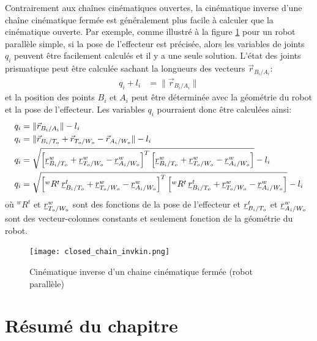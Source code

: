 Contrairement aux chaînes cinématiques ouvertes, la cinématique inverse d'une chaîne cinématique fermée est généralement plus facile à calculer que la cinématique ouverte. Par exemple, comme illustré à la figure \ref{fig:closed_chain_invkin} pour un robot parallèle simple, si la pose de l'effecteur est précisée, alors les variables de joints $q_i$ peuvent être facilement calculés et il y a une seule solution. L'état des joints prismatique peut être calculée sachant la longueurs des vecteurs $\vec{r}_{B_i/A_i}$:
\begin{align}
q_i + l_i &= \| \vec{r}_{B_i/A_i} \|
\end{align} 
et la position des points $B_i$ et $A_i$ peut être déterminée avec la géométrie du robot et la pose de l'effecteur. Les variables $q_i$ pourraient donc être calculées ainsi:
\begin{align}
q_i &= \| \vec{r}_{B_i/A_i} \| - l_i \\
q_i &= \| \vec{r}_{B_i/T_o} +  \vec{r}_{T_o/W_o} - \vec{r}_{A_i/W_o} \| - l_i \\
q_i &= \sqrt{\left[  \underline{r}_{B_i/T_o}^w + \underline{r}_{T_o/W_o}^w - \underline{r}_{A_i/W_o}^w
\right]^T \left[  \underline{r}_{B_i/T_o}^w + \underline{r}_{T_o/W_o}^w - \underline{r}_{A_i/W_o}^w
\right]} - l_i \\
q_i &= \sqrt{\left[  {}^wR^t \, \underline{r}_{B_i/T_o}^t + \underline{r}_{T_o/W_o}^w - \underline{r}_{A_i/W_o}^w
\right]^T \left[  {}^wR^t \, \underline{r}_{B_i/T_o}^t + \underline{r}_{T_o/W_o}^w - \underline{r}_{A_i/W_o}^w \right]} - l_i
\end{align} 
où ${}^wR^t$ et $\underline{r}_{T_o/W_o}^w$ sont des fonctions de la pose de l'effecteur et $\underline{r}_{B_i/T_o}^t$ et $\underline{r}_{A_i/W_o}^w$ sont des vecteur-colonnes constants et seulement fonction de la géométrie du robot. 

\begin{figure}[H]
	\centering
		\texttt{[image: closed\_chain\_invkin.png]}
	\caption{Cinématique inverse d'un chaine cinématique fermée (robot parallèle)}
	\label{fig:closed_chain_invkin}
\end{figure}




\newpage
\section{Résumé du chapitre}

